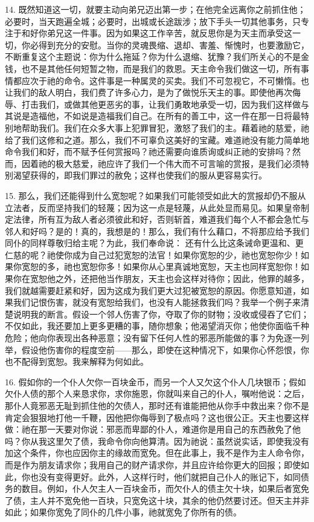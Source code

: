 14. 既然知道这一切，就要主动向弟兄迈出第一步；在他完全远离你之前抓住他；必要时，当天跑遍全城；必要时，出城或长途跋涉；放下手头一切其他事务，只专注于和好你弟兄这一件事。因为如果这工作辛苦，就反思你是为天主而承受这一切，你必得到充分的安慰。当你的灵魂畏缩、退却、害羞、惭愧时，也要激励它，不断重复这个主题说：你为什么拖延？你为什么退缩、犹豫？我们所关心的不是金钱，也不是其他任何短暂之物，而是我们的救恩。天主命令我们做这一切，所有事情都应次于祂的命令。这件事是一种属灵的买卖。我们不可忽视它，不可懒惰。也让我们的敌人明白，我们费了许多心力，是为了做悦乐天主的事。即使他再次侮辱、打击我们，或做其他更恶劣的事，让我们勇敢地承受一切，因为我们这样做与其说是造福他，不如说是造福我们自己。在所有的善工中，这一件在那一日将最特别地帮助我们。我们在众多大事上犯罪冒犯，激怒了我们的主。藉着祂的慈爱，祂给了我们这修和之道。那么，我们不可辜负这美好的宝藏。难道祂没有能力简单地命令我们和好，而不赋予任何赏报吗？祂还需要向谁质询或纠正祂的安排吗？然而，因着祂的极大慈爱，祂应许了我们一个伟大而不可言喻的赏报，是我们必须特别渴望获得的，即我们罪过的赦免；这样也使我们的服从更容易实行。\par

15. 那么，我们还能得到什么宽恕呢？如果我们可能领受如此大的赏报却仍不服从立法者，反而坚持我们的轻蔑；因为这一点是轻蔑，从此处显而易见。如果皇帝制定法律，所有互为敌人者必须彼此和好，否则斩首，难道我们每个人不都会急忙与邻人和好吗？是的！真的，我想是的！那么，我们有什么藉口，不将那应给予我们同仆的同样尊敬归给主呢？为此，我们奉命说：  还有什么比这条诫命更温和、更仁慈的呢？祂使你成为自己过犯宽恕的法官！如果你宽恕的少，祂也宽恕你少！如果你宽恕的多，祂也宽恕你多！如果你从心里真诚地宽恕，天主也同样宽恕你！如果你在宽恕他之外，还把他当作朋友，天主也会这样对待你；因此，他罪的越多，我们就越需要赶紧和好，因为这成为我们更大过犯被宽恕的原因。你愿意知道，如果我们记恨伤害，就没有宽恕给我们，也没有人能拯救我们吗？我举一个例子来清楚说明我的断言。假设一个邻人伤害了你，夺取了你的财物；没收或侵吞了它们；不仅如此，我还要加上更多更糟的事，随你想象；他渴望消灭你；他使你面临千种危险；他向你表现出各种恶意；没有留下任何人性的邪恶所能做的事？为免逐一列举，假设他伤害你的程度空前——那么，即使在这种情况下，如果你心怀怨恨，你也不配得到宽恕。我来解释为何如此。\par

16. 假如你的一个仆人欠你一百块金币，而另一个人又欠这个仆人几块银币；假如欠仆人债的那个人来恳求你，求你施恩，你就叫来自己的仆人，嘱咐他说：之后，那仆人竟邪恶无耻到抓住他的欠债人，那时还有谁能把他从你手中救出来？你不是肯定会狠狠地打他一千鞭，因他把你侮辱到了极点吗？这也很公正。天主也要这样做：祂在那一天要对你说：邪恶而卑鄙的仆人，难道你是用自己的东西赦免了他吗？你从我这里欠了债，我命令你向他算清。因为祂说：虽然说实话，即使我没有加这个条件，你也应因你主的缘故而宽免。但在此事上，我不是作为主人命令你，而是作为朋友请求你；我用自己的财产请求你，并且应许给你更大的回报；即使如此，你也没有变得更好。此外，人这样行时，他们就把自己仆人的账记下，如同债务的数目。例如，仆人欠主人一百块金币，而欠仆人的债主欠十块，如果后者宽免了债，主人并不宽免他一百块，只宽免这十块，其余的他仍然要讨还。但天主并非如此；如果你宽免了同仆的几件小事，祂就宽免了你所有的债。\par

